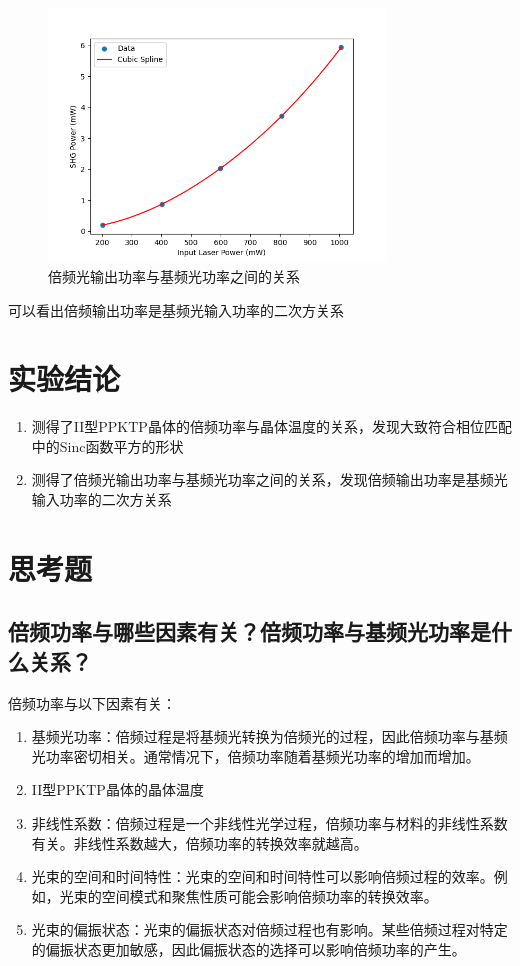 \documentclass[a4paper,UTF8]{ctexart}
\begin{document}
\begin{figure}[H]
    \centering
    \begin{minipage}[b]{0.9\textwidth}
        \centering
        \includegraphics[width=0.8\textwidth]{./ffig2.png}
        \caption{倍频光输出功率与基频光功率之间的关系}
    \end{minipage}
\end{figure}

可以看出倍频输出功率是基频光输入功率的二次方关系

\section{实验结论}

\begin{enumerate}
    \item 测得了II型PPKTP晶体的倍频功率与晶体温度的关系，发现大致符合相位匹配中的Sinc函数平方的形状
    \item 测得了倍频光输出功率与基频光功率之间的关系，发现倍频输出功率是基频光输入功率的二次方关系
\end{enumerate}

\section{思考题}

\subsection{倍频功率与哪些因素有关？倍频功率与基频光功率是什么关系？}

倍频功率与以下因素有关：
\begin{enumerate}
    \item 基频光功率：倍频过程是将基频光转换为倍频光的过程，因此倍频功率与基频光功率密切相关。通常情况下，倍频功率随着基频光功率的增加而增加。
    \item II型PPKTP晶体的晶体温度
    \item 非线性系数：倍频过程是一个非线性光学过程，倍频功率与材料的非线性系数有关。非线性系数越大，倍频功率的转换效率就越高。
    \item 光束的空间和时间特性：光束的空间和时间特性可以影响倍频过程的效率。例如，光束的空间模式和聚焦性质可能会影响倍频功率的转换效率。
    \item 光束的偏振状态：光束的偏振状态对倍频过程也有影响。某些倍频过程对特定的偏振状态更加敏感，因此偏振状态的选择可以影响倍频功率的产生。
\end{enumerate}
\end{document}
